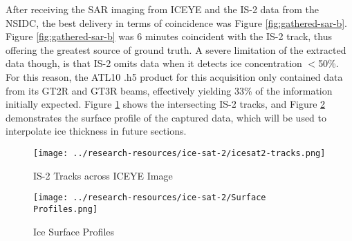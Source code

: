 After receiving the SAR imaging from ICEYE and the IS-2 data from the NSIDC, the best delivery in terms of coincidence was Figure \ref{fig:gathered-sar-b}. Figure \ref{fig:gathered-sar-b} was 6 minutes coincident with the IS-2 track, thus offering the greatest source of ground truth. A severe limitation of the extracted data though, is that IS-2 omits data when it detects ice concentration $<$50\%. For this reason, the ATL10 .h5 product for this acquisition only contained data from its GT2R and GT3R beams, effectively yielding 33\% of the information initially expected. Figure \ref{fig:icesat2-tracks} shows the intersecting IS-2 tracks, and Figure \ref{fig:ice-thickness-gathered} demonstrates the surface profile of the captured data, which will be used to interpolate ice thickness in future sections.


\begin{figure}[h!]
	\centering
	\texttt{[image: ../research-resources/ice-sat-2/icesat2-tracks.png]}
	\caption[Overlaid LiDAR and SAR Readings]{IS-2 Tracks across ICEYE Image}
	\label{fig:icesat2-tracks}
\end{figure}

\begin{figure}[h!]
	\centering
	\texttt{[image: ../research-resources/ice-sat-2/Surface Profiles.png]}
	\caption[Ice Surface Profile of Acquired Data]{Ice Surface Profiles}
	\label{fig:ice-thickness-gathered}
\end{figure}

